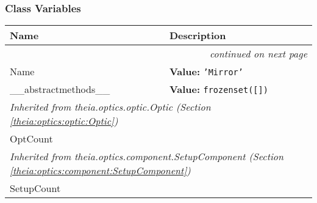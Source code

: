   \subsubsection{Class Variables}

    \vspace{-1cm}
\hspace{\varindent}\begin{longtable}{|p{\varnamewidth}|p{\vardescrwidth}|l}
\cline{1-2}
\cline{1-2} \centering \textbf{Name} & \centering \textbf{Description}& \\
\cline{1-2}
\endhead\cline{1-2}\multicolumn{3}{r}{\small\textit{continued on next page}}\\\endfoot\cline{1-2}
\endlastfoot\raggedright N\-a\-m\-e\- & \raggedright \textbf{Value:} 
{\tt \texttt{'}\texttt{Mirror}\texttt{'}}&\\
\cline{1-2}
\raggedright \_\-\_\-a\-b\-s\-t\-r\-a\-c\-t\-m\-e\-t\-h\-o\-d\-s\-\_\-\_\- & \raggedright \textbf{Value:} 
{\tt \texttt{frozenset([}\texttt{])}}&\\
\cline{1-2}
\multicolumn{2}{|l|}{\textit{Inherited from theia.optics.optic.Optic \textit{(Section \ref{theia:optics:optic:Optic})}}}\\
\multicolumn{2}{|p{\varwidth}|}{\raggedright OptCount}\\
\cline{1-2}
\multicolumn{2}{|l|}{\textit{Inherited from theia.optics.component.SetupComponent \textit{(Section \ref{theia:optics:component:SetupComponent})}}}\\
\multicolumn{2}{|p{\varwidth}|}{\raggedright SetupCount}\\
\cline{1-2}
\end{longtable}

